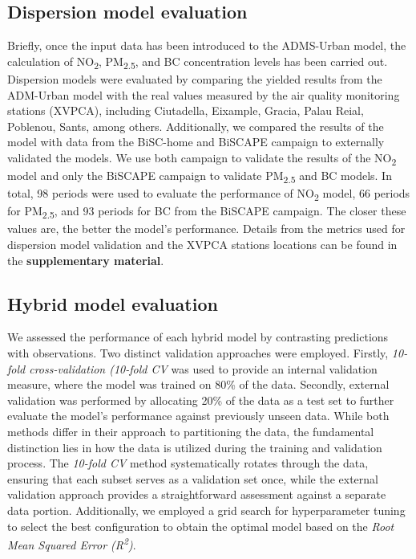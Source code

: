 \documentclass{article}
\begin{document}
\subsection{Dispersion model evaluation}
Briefly, once the input data has been introduced to the ADMS-Urban model, the calculation of NO\textsubscript{2}, PM\textsubscript{2.5}, and BC concentration levels has been carried out. Dispersion models were evaluated by comparing the yielded results from the ADM-Urban model with the real values measured by the air quality monitoring stations (XVPCA), including Ciutadella, Eixample, Gracia, Palau Reial, Poblenou, Sants, among others. Additionally, we compared the results of the model with data from the BiSC-home and BiSCAPE campaign to externally validated the models. We use both campaign to validate the results of the NO\textsubscript{2} model and only the BiSCAPE campaign to validate PM\textsubscript{2.5} and BC models. In total, 98 periods were used to evaluate the performance of NO\textsubscript{2} model, 66 periods for PM\textsubscript{2.5}, and 93 periods for BC from the BiSCAPE campaign. The closer these values are, the better the model's performance. Details from the metrics used for dispersion model validation and the XVPCA stations locations can be found in the \textbf{supplementary material}. 

\subsection{Hybrid model evaluation}
We assessed the performance of each hybrid model by contrasting predictions with observations. Two distinct validation approaches were employed. Firstly, \textit{10-fold cross-validation (10-fold CV} was used to provide an internal validation measure, where the model was trained on 80\% of the data. Secondly, external validation was performed by allocating 20\% of the data as a test set to further evaluate the model's performance against previously unseen data. While both methods differ in their approach to partitioning the data, the fundamental distinction lies in how the data is utilized during the training and validation process. The \textit{10-fold CV} method systematically rotates through the data, ensuring that each subset serves as a validation set once, while the external validation approach provides a straightforward assessment against a separate data portion. Additionally, we employed a grid search for hyperparameter tuning to select the best configuration to obtain the optimal model based on the \textit{Root Mean Squared Error (R\textsuperscript{2})}. 
\end{document}
